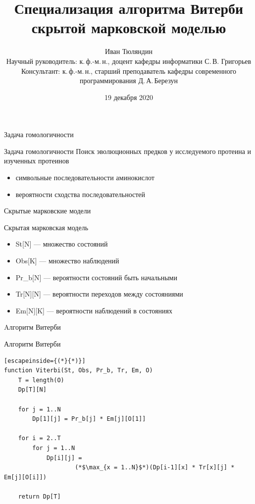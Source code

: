 \documentclass[hyperref={pdfpagelabels=false}]{beamer}
\begin{document}
  
\title[Специализация алгоритма Витерби]{Специализация алгоритма Витерби скрытой марковской моделью}  
\author[И. Тюляндин]{Иван Тюляндин\\%
Научный руководитель: к.\,ф.-м.\,н., доцент кафедры информатики С.\,В. Григорьев\\%
Консультант: к.\,ф.-м.\,н., старший преподаватель кафедры современного программирования Д.\,А.\,Березун\\%
} 
\date{19 декабря 2020} 
{
}


\begin{frame}{Задача гомологичности}
\begin{block}{Задача гомологичности}
	Поиск эволюционных предков у исследуемого протеина и изученных протеинов
	\begin{itemize}
		\item символьные последовательности аминокислот
		\item вероятности сходства последовательностей
	\end{itemize}
\end{block}
\end{frame} 


\begin{frame}{Скрытые марковские модели}
\begin{block}{Скрытая марковская модель}
\begin{itemize}
	\item St[N] — множество состояний
	\item Obs[K] — множество наблюдений
	\item Pr\_b[N] — вероятности состояний быть начальными
	\item Tr[N][N] — вероятности переходов между состояниями
	\item Em[N][K] — вероятности наблюдений в состояниях
\end{itemize}
\end{block}
\end{frame}


\begin{frame}[fragile]{Aлгоритм Витерби}
\begin{block}{Алгоритм Витерби}
\begin{lstlisting}[escapeinside={(*}{*)}]
function Viterbi(St, Obs, Pr_b, Tr, Em, O)
	T = length(O)
	Dp[T][N]

	for j = 1..N
		Dp[1][j] = Pr_b[j] * Em[j][O[1]]
	
	for i = 2..T
		for j = 1..N
			Dp[i][j] = 
					(*$\max_{x = 1..N}$*)(Dp[i-1][x] * Tr[x][j] * Em[j][O[i]])

	return Dp[T]
\end{lstlisting}
\end{block}
\end{frame}
\end{document}
